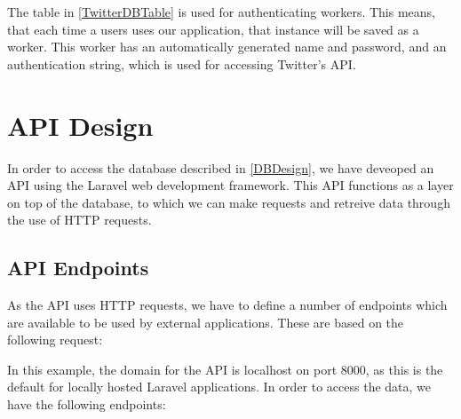 The table in \autoref{TwitterDBTable} is used for authenticating workers. This
means, that each time a users uses our application, that instance will be saved
as a worker. This worker has an automatically generated name and password, and
an authentication string, which is used for accessing Twitter's API.


\section{API Design}
In order to access the database described in \autoref{DBDesign}, we have
deveoped an API using the Laravel web development framework. This API functions
as a layer on top of the database, to which we can make requests and retreive
data through the use of HTTP requests.

\subsection{API Endpoints}
As the API uses HTTP requests, we have to define a number of endpoints which are
available to be used by external applications. These are based on the following
request:\nl

\nl

In this example, the domain for the API is localhost on port 8000, as this is
the default for locally hosted Laravel applications. In order to access the
data, we have the following endpoints:

